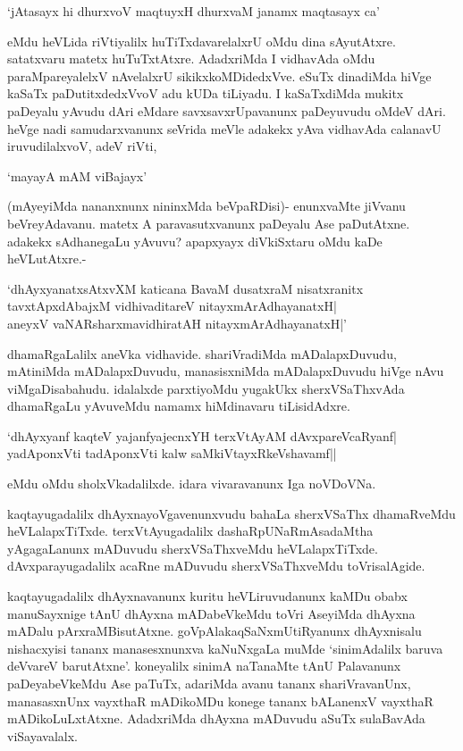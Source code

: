 \begin{shloka}
`jAtasayx hi dhurxvoV maqtuyxH dhurxvaM janamx maqtasayx ca'
\end{shloka} 

eMdu heVLida riVtiyalilx huTiTxdavarelalxrU oMdu dina sAyutAtxre. satatxvaru matetx huTuTxtAtxre. AdadxriMda I vidhavAda oMdu paraMpareyalelxV nAvelalxrU sikikxkoMDidedxVve. eSuTx dinadiMda hiVge kaSaTx paDutitxdedxVvoV adu kUDa tiLiyadu. I kaSaTxdiMda mukitx paDeyalu yAvudu dAri eMdare savxsavxrUpavanunx paDeyuvudu oMdeV dAri. heVge nadi samudarxvanunx seVrida meVle adakekx yAva vidhavAda calanavU iruvudilalxvoV, adeV riVti, 

\begin{shloka}
`mayayA mAM viBajayx'
\end{shloka}

(mAyeyiMda nananxnunx nininxMda beVpaRDisi)- enunxvaMte jiVvanu beVreyAdavanu. matetx A paravasutxvanunx paDeyalu Ase paDutAtxne. adakekx sAdhanegaLu yAvuvu? apapxyayx diVkiSxtaru oMdu kaDe heVLutAtxre.-

\begin{shloka}
`dhAyxyanatxsAtxvXM katicana BavaM dusatxraM nisatxranitx\\
tavxtApxdAbajxM vidhivaditareV nitayxmArAdhayanatxH|\\
aneyxV vaNARsharxmavidhiratAH nitayxmArAdhayanatxH|'
\end{shloka}

dhamaRgaLalilx aneVka vidhavide. shariVradiMda mADalapxDuvudu, mAtiniMda mADalapxDuvudu, manasisxniMda mADalapxDuvudu hiVge nAvu viMgaDisabahudu. idalalxde parxtiyoMdu yugakUkx sherxVSaThxvAda dhamaRgaLu yAvuveMdu namamx hiMdinavaru tiLisidAdxre.

\begin{shloka}
`dhAyxyanf kaqteV yajanfyajecnxYH terxVtAyAM dAvxpareV\s caRyanf|\\
yadAponxVti tadAponxVti kalw saMkiVtayxRkeVshavamf||
\end{shloka}

\noindent eMdu oMdu sholxVkadalilxde. idara vivaravanunx Iga noVDoVNa.

kaqtayugadalilx dhAyxnayoVgavenunxvudu bahaLa sherxVSaThx dhamaRveMdu heVLalapxTiTxde. terxVtAyugadalilx dashaRpUNaRmAsadaMtha yAgagaLanunx mADuvudu sherxVSaThxveMdu heVLalapxTiTxde. dAvxparayugadalilx acaRne mADuvudu sherxVSaThxveMdu toVrisalAgide.

kaqtayugadalilx dhAyxnavanunx kuritu heVLiruvudanunx kaMDu obabx manuSayxnige tAnU dhAyxna mADabeVkeMdu toVri AseyiMda dhAyxna mADalu pArxraMBisutAtxne. goVpAlakaqSaNxmUtiRyanunx dhAyxnisalu nishacxyisi tananx manasesxnunxva kaNuNxgaLa muMde `sinimAdalilx baruva deVvareV barutAtxne'. koneyalilx sinimA naTanaMte tAnU Palavanunx paDeyabeVkeMdu Ase paTuTx, adariMda avanu tananx shariVravanUnx, manasasxnUnx vayxthaR mADikoMDu konege tananx bALanenxV vayxthaR mADikoLuLxtAtxne. AdadxriMda dhAyxna mADuvudu aSuTx sulaBavAda viSayavalalx.


